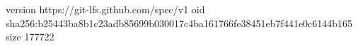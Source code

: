 version https://git-lfs.github.com/spec/v1
oid sha256:b25443ba8b1c23adb85699b030017c4ba161766fe38451eb7f441e0c6144b165
size 177722
